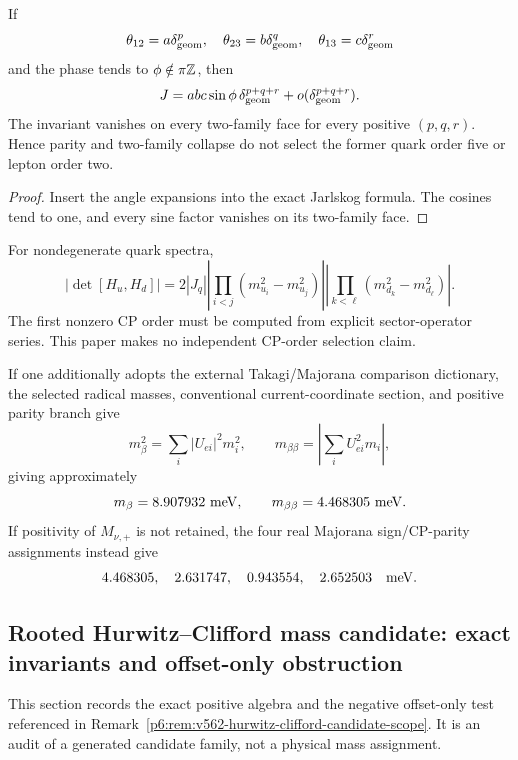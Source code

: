 \documentclass[11pt,a4paper]{article}
\begin{document}
\begin{theorem}
\label{p6:thm:cp-order-no-go}
If
\[
\theta_{12}=a\delta_{\rm geom}^p,\quad
\theta_{23}=b\delta_{\rm geom}^q,\quad
\theta_{13}=c\delta_{\rm geom}^r
\]
and the phase tends to
\(\phi\notin\pi\mathbb{Z}\), then
\[
J=abc\sin\phi\,
\delta_{\rm geom}^{p+q+r}
+o(\delta_{\rm geom}^{p+q+r}).
\]
The invariant vanishes on every two-family face for every positive
\((p,q,r)\).  Hence parity and two-family collapse do not select the former
quark order five or lepton order two.
\end{theorem}

\begin{proof}
Insert the angle expansions into the exact Jarlskog formula.  The cosines
tend to one, and every sine factor vanishes on its two-family face.
\end{proof}

\begin{corollary}
\label{p6:cor:operator-first-cp}
For nondegenerate quark spectra,
\[
|\det[H_u,H_d]|
=
2|J_q|
\left|\prod_{i<j}(m_{u_i}^2-m_{u_j}^2)\right|
\left|\prod_{k<\ell}(m_{d_k}^2-m_{d_\ell}^2)\right|.
\]
The first nonzero CP order must be computed from explicit sector-operator
series.  This paper makes no independent CP-order selection claim.
\end{corollary}

\begin{corollary}
\label{p6:cor:conditional-beta-readouts}
If one additionally adopts the external Takagi/Majorana comparison dictionary, the selected radical masses, conventional current-coordinate section, and positive parity branch give
\[
m_\beta^2=\sum_i|U_{ei}|^2m_i^2,
\qquad
m_{\beta\beta}=\left|\sum_iU_{ei}^2m_i\right|,
\]
giving approximately
\[
m_\beta=8.907932\ {\rm meV},
\qquad
m_{\beta\beta}=4.468305\ {\rm meV}.
\]
If positivity of \(M_{\nu,+}\) is not retained, the four real Majorana
sign/CP-parity assignments instead give
\[
4.468305,\quad2.631747,\quad0.943554,\quad2.652503
\quad{\rm meV}.
\]
\end{corollary}

\label{p6:part:interfaces}

\subsection{Rooted Hurwitz--Clifford mass candidate: exact invariants and offset-only obstruction}
\label{p6:app:v562-hurwitz-clifford-mass-candidate}
This section records the exact positive algebra and the negative offset-only
test referenced in
Remark~\ref{p6:rem:v562-hurwitz-clifford-candidate-scope}.  It is an audit of
a generated candidate family, not a physical mass assignment.
\end{document}
